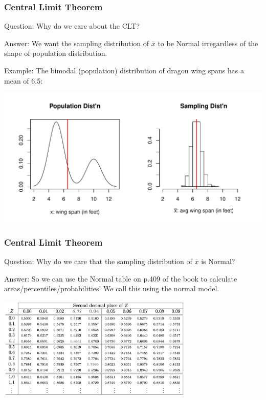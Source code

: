 \documentclass[slides]{beamer}
\newcommand{\blue}[1]{\textcolor{blue2}{#1}}
\newcommand{\xbar}{\overline{x}}
\begin{document}
\begin{frame}
\frametitle{Central Limit Theorem}
\blue{Question}:  Why do we care about the CLT?

\vspace{0.25cm}

\blue{Answer}:  We want the sampling distribution of $\xbar$ to be Normal \blue{irregardless} of the shape of population distribution.

\vspace{0.25cm}

\blue{Example}:  The bimodal (population) distribution of dragon wing spans has a mean of 6.5:

\begin{center}
\includegraphics[width=\textwidth]{figure/CLT2.pdf}
\end{center}

\end{frame}


\begin{frame}
\frametitle{Central Limit Theorem}
\blue{Question}:  Why do we care that the sampling distribution of $\xbar$ is Normal?

\vspace{0.25cm}

\pause\blue{Answer}:  So we can use the Normal table on p.409 of the book to calculate areas/percentiles/probabilities!  We call this using the \blue{normal model}.

\vspace{0.25cm}

\begin{center}
\includegraphics[width=0.7\textwidth]{figure/normal_table.png}
\end{center}


\end{frame}
\end{document}
